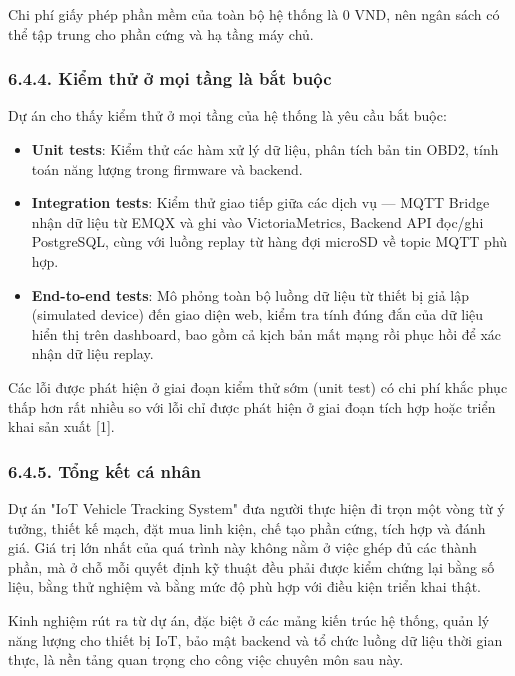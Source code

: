 \documentclass[13pt,a4paper]{extarticle}
\renewcommand{\\}{\thesislongtableorignewline\hline}%
\providecommand{\tightlist}{%
  \setlength{\itemsep}{0pt}\setlength{\parskip}{0pt}}
\begin{document}
Chi phí giấy phép phần mềm của toàn bộ hệ thống là 0 VND, nên ngân sách
có thể tập trung cho phần cứng và hạ tầng máy chủ.

\subsubsection{6.4.4. Kiểm thử ở mọi tầng là bắt
buộc}\label{644-kiux1ec3m-thux1eed-ux1edf-mux1ecdi-tux1ea7ng-luxe0-bux1eaft-buux1ed9c}

Dự án cho thấy kiểm thử ở mọi tầng của hệ thống là yêu cầu bắt buộc:

\begin{itemize}
\tightlist
\item
  \textbf{Unit tests}: Kiểm thử các hàm xử lý dữ liệu, phân tích bản tin
  OBD2, tính toán năng lượng trong firmware và backend.
\item
  \textbf{Integration tests}: Kiểm thử giao tiếp giữa các dịch vụ ---
  MQTT Bridge nhận dữ liệu từ EMQX và ghi vào VictoriaMetrics, Backend
  API đọc/ghi PostgreSQL, cùng với luồng replay từ hàng đợi microSD về
  topic MQTT phù hợp.
\item
  \textbf{End-to-end tests}: Mô phỏng toàn bộ luồng dữ liệu từ thiết bị
  giả lập (simulated device) đến giao diện web, kiểm tra tính đúng đắn
  của dữ liệu hiển thị trên dashboard, bao gồm cả kịch bản mất mạng rồi
  phục hồi để xác nhận dữ liệu replay.
\end{itemize}

Các lỗi được phát hiện ở giai đoạn kiểm thử sớm (unit test) có chi phí
khắc phục thấp hơn rất nhiều so với lỗi chỉ được phát hiện ở giai đoạn
tích hợp hoặc triển khai sản xuất {[}1{]}.

\subsubsection{6.4.5. Tổng kết cá
nhân}\label{645-tux1ed5ng-kux1ebft-cuxe1-nhuxe2n}

Dự án "IoT Vehicle Tracking System" đưa người thực hiện đi trọn một vòng
từ ý tưởng, thiết kế mạch, đặt mua linh kiện, chế tạo phần cứng, tích
hợp và đánh giá. Giá trị lớn nhất của quá trình này không nằm ở việc
ghép đủ các thành phần, mà ở chỗ mỗi quyết định kỹ thuật đều phải được
kiểm chứng lại bằng số liệu, bằng thử nghiệm và bằng mức độ phù hợp với
điều kiện triển khai thật.

Kinh nghiệm rút ra từ dự án, đặc biệt ở các mảng kiến trúc hệ thống,
quản lý năng lượng cho thiết bị IoT, bảo mật backend và tổ chức luồng dữ
liệu thời gian thực, là nền tảng quan trọng cho công việc chuyên môn sau
này.
\end{document}
